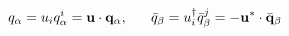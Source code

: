 \begin{equation}                      
q_{\alpha} = u_{i} q_{\alpha}^{i} = {\bf u} \cdot{\bf q}_{\alpha} ,~~~~~                      
\bar{q}_{\beta} = u_{i}^{\dagger} \bar{q}_{\beta}^{j} = -{\bf u}^{*}                       
\cdot \bar{\bf q}_{\beta}        \label{eq:qal}                      
\end{equation} 
